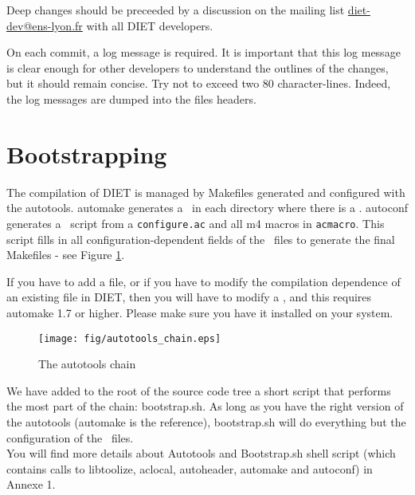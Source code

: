 Deep changes should be preceeded by a discussion on the mailing list
\url{diet-dev@ens-lyon.fr} with all DIET developers.

On each commit, a log message is required. It is important that this log message
is clear enough for other developers to understand the outlines of the changes,
but it should remain concise. Try not to exceed two 80 character-lines.  Indeed,
the log messages are dumped into the files headers.


\section{Bootstrapping}

The compilation of DIET is managed by Makefiles generated and configured with
the autotools. \textsf{automake} generates a \makein\ in each
directory where there is a \makeam. \textsf{autoconf} generates a
\configure\ script from a \texttt{configure.ac} and all m4 macros in
\texttt{acmacro}. This script fills in all configuration-dependent fields of the
\makein\ files to generate the final Makefiles - see Figure
\ref{fig:autochain}.

If you have to add a file, or if you have to modify the
compilation dependence of an existing file in DIET, then you will have to modify
a \makeam, and this requires \textsf{automake 1.7} or
higher. Please make sure you have it installed on your system.


\begin{figure}[hbt]
\begin{center}
\texttt{[image: fig/autotools\_chain.eps]}
\end{center}
\label{fig:autochain}
\caption{The autotools chain}
\end{figure}

We have added to the root of the source code tree a short script that performs
the most part of the chain: \textsf{bootstrap.sh}. As long as you have the right
version of the autotools (\textsf{automake} is the reference),
\textsf{bootstrap.sh} will do everything but the configuration of the
\makein\ files.\\


You will find more details about Autotools and Bootstrap.sh shell script 
(which contains calls to libtoolize, aclocal, autoheader, automake and 
autoconf) in Annexe 1.


